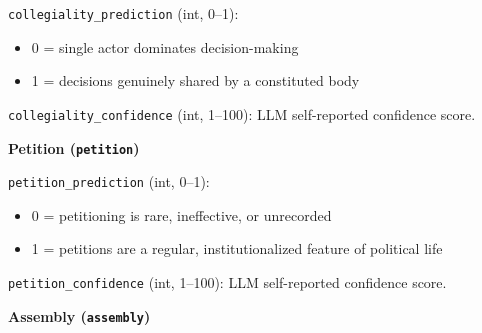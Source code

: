\documentclass[11pt, a4paper]{article}
\newenvironment{promptquote}{%
  \begin{quote}\small
}{%
  \end{quote}
}
\begin{document}

\texttt{collegiality\_prediction} (int, 0--1):
\begin{itemize}[nosep, leftmargin=1.7em]
  \item 0 = single actor dominates decision-making
  \item 1 = decisions genuinely shared by a constituted body
\end{itemize}
\texttt{collegiality\_confidence} (int, 1--100): LLM self-reported confidence score.

\bigskip
\textbf{Petition (\texttt{petition})}



\texttt{petition\_prediction} (int, 0--1):
\begin{itemize}[nosep, leftmargin=1.7em]
  \item 0 = petitioning is rare, ineffective, or unrecorded
  \item 1 = petitions are a regular, institutionalized feature of political life
\end{itemize}
\texttt{petition\_confidence} (int, 1--100): LLM self-reported confidence score.

\bigskip
\textbf{Assembly (\texttt{assembly})}

\end{document}
